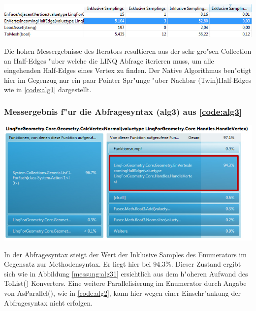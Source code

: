 \documentclass[pagesize, paper=a4, fontsize=12pt,titlepage=true, headings=small, headnosepline, abstractoff, liststotoc, nochapterprefix, plainheadsepline]{scrreprt}
\begin{document}
\begin{minipage}[c][5cm]{\linewidth}
\includegraphics[width=\linewidth]{../Messung/2-linq-envertexinche-1}
\label{messung:alg21}
\end{minipage}

Die hohen Messergebnisse des Iterators resultieren aus der sehr gro"sen Collection an Half-Edges "uber welche die LINQ Abfrage iterieren muss, um alle eingehenden Half-Edges eines Vertex zu finden. Der Native Algorithmus ben"otigt hier im Gegenzug nur ein paar Pointer Spr"unge "uber Nachbar (Twin)Half-Edges wie in \ref{code:alg1} dargestellt. \label{ref:linqNativeSampling1}


\subsubsection{Messergebnis f"ur die Abfragesyntax (alg3) aus \ref{code:alg3}}
\begin{minipage}[c][8cm]{\linewidth}
\includegraphics[width=\linewidth]{../Messung/2-linq-calcvertnormals-2}
\label{messung:alg30}
\end{minipage}

In der Abfragesyntax steigt der Wert der Inklusive Samples des Enumerators im Gegensatz zur Methodensyntax. Er liegt hier bei 94.3\%. Dieser Zustand ergibt sich wie in Abbildung \ref{messung:alg31} ersichtlich aus dem h"oheren Aufwand des ToList() Konverters. Eine weitere Parallelisierung im Enumerator durch Angabe von AsParallel(), wie in \ref{code:alg2}, kann hier wegen einer Einschr"ankung der Abfragesyntax nicht erfolgen.
\end{document}
